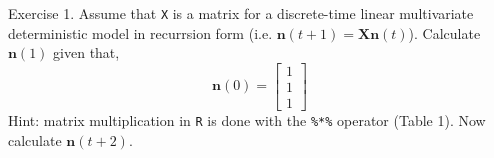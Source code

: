\documentclass[11pt]{article}\usepackage[]{graphicx}\usepackage[]{color}
\newcommand{\code}[1]{{\tt #1}}
\numberwithin{exercise}{section}
\begin{document}



Exercise 1. Assume that \code{X} is a matrix for a discrete-time linear
multivariate deterministic model in recurrsion form (i.e. $\mathbf n(t+1)
= \mathbf X \mathbf n(t)$). Calculate $\mathbf n(1)$ given that, 
\begin{equation*}
\mathbf n(0) = \begin{bmatrix} 1 \\ 1 \\ 1 \end{bmatrix}
\end{equation*}
Hint: matrix multiplication in \code{R} is done with the \code{\%*\%}
operator (Table 1). Now calculate $\mathbf n(t+2)$.
\end{document}
